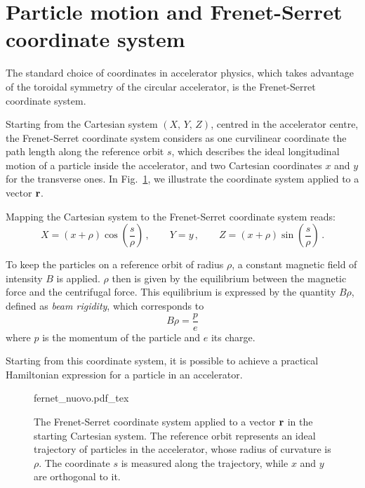\section{Particle motion and Frenet-Serret coordinate system~\label{sec:acc:fernet}}

The standard choice of coordinates in accelerator physics, which takes advantage of the toroidal symmetry of the circular accelerator, is the Frenet-Serret coordinate system.

Starting from the Cartesian system $(X,\, Y,\, Z)$, centred in the accelerator centre, the Frenet-Serret coordinate system considers as one curvilinear coordinate the path length along the reference orbit $s$, which describes the ideal longitudinal motion of a particle inside the accelerator, and two Cartesian coordinates $x$ and $y$ for the transverse ones. In Fig.~\ref{fig:frenserr}, we illustrate the coordinate system applied to a vector $\vb{r}$.

Mapping the Cartesian system to the Frenet-Serret coordinate system reads:
%
\begin{equation} 
    X = (x+\rho)\cos(\frac{s}{\rho})\,, \qquad Y=y\,, \qquad Z=(x+\rho)\sin(\frac{s}{\rho})\,.
\end{equation}

To keep the particles on a reference orbit of radius $\rho$, a constant magnetic field of intensity $B$ is applied. $\rho$ then is given by the equilibrium between the magnetic force and the centrifugal force. This equilibrium is expressed by the quantity $B\rho$, defined as \textit{beam rigidity}, which corresponds to
\begin{equation}
    B\rho = \frac{p}{e}
    \label{eq:beam_rigidity}
\end{equation}
where $p$ is the momentum of the particle and $e$ its charge.

Starting from this coordinate system, it is possible to achieve a practical Hamiltonian expression for a particle in an accelerator.

\begin{figure}
\centering
\def\svgwidth{0.75\columnwidth}
{fernet_nuovo.pdf_tex}
\caption{The Frenet-Serret coordinate system applied to a vector $\vb{r}$ in the starting Cartesian system. The reference orbit represents an ideal trajectory of particles in the accelerator, whose radius of curvature is $\rho$. The coordinate $s$ is measured along the trajectory, while $x$ and $y$ are orthogonal to it.}
\label{fig:frenserr}
\end{figure}

